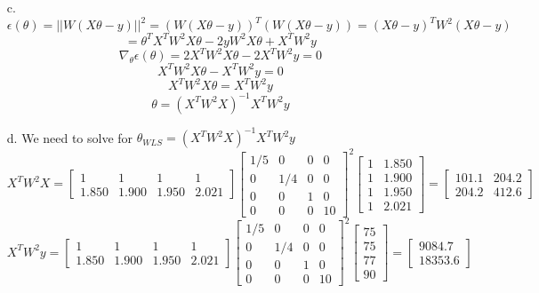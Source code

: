 \documentclass[12pt]{article}
\begin{document}
\begin{enumerate}
	\item[c.]
	\[
	\epsilon (\theta ) = || W(X\theta - y)||^{2} = (W(X\theta - y))^{T}(W(X\theta - y)) = (X\theta - y)^{T}W^{2}(X\theta - y)
	\]
	\[
	= \theta^{T}X^{T}W^{2}X\theta - 2yW^{2}X\theta + X^{T}W^{2}y
	\]
	\[
	\nabla_{\theta} \epsilon (\theta ) = 2X^{T}W^{2}X\theta - 2X^{T}W^{2}y = 0
	\]
	\[
	X^{T}W^{2}X\theta - X^{T}W^{2}y = 0
	\]
	\[
	X^{T}W^{2}X\theta = X^{T}W^{2}y 
	\]
	\[
	\theta = (X^{T}W^{2}X)^{-1}X^{T}W^{2}y
	\]
	
	\item[d. ]We need to solve for $\theta_{WLS} = (X^{T}W^{2}X)^{-1}X^{T}W^{2}y$
	\[
	X^{T}W^{2}X = \begin{bmatrix}
	1 & 1 & 1 & 1 \\
	1.850 & 1.900 & 1.950 & 2.021
	\end{bmatrix}
	\begin{bmatrix}
	1/5 & 0 & 0 & 0 \\
	0 & 1/4 & 0 & 0 \\
	0 & 0 & 1 & 0 \\
	0 & 0 & 0 & 10
	\end{bmatrix}^{2}
	\begin{bmatrix}
	1 & 1.850 \\
	1 & 1.900 \\
	1 & 1.950 \\
	1 & 2.021
	\end{bmatrix} =
	\begin{bmatrix}
	101.1 & 204.2 \\
	204.2 & 412.6
	\end{bmatrix}
	\]
	\[
	X^{T}W^{2}y = \begin{bmatrix}
	1 & 1 & 1 & 1 \\
	1.850 & 1.900 & 1.950 & 2.021
	\end{bmatrix}
	\begin{bmatrix}
	1/5 & 0 & 0 & 0 \\
	0 & 1/4 & 0 & 0 \\
	0 & 0 & 1 & 0 \\
	0 & 0 & 0 & 10
	\end{bmatrix}^{2}
	\begin{bmatrix}
	75 \\ 75 \\ 77 \\ 90
	\end{bmatrix} =
	\begin{bmatrix}
	9084.7 \\ 18353.6
	\end{bmatrix}
	\]
	\[
\]
\end{enumerate}
\end{document}
